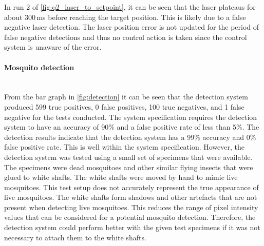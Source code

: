 In run 2 of \autoref{fig:q2_laser_to_setpoint}, it can be seen that the laser plateaus for about 300\,ms before reaching the target position. This is likely due to a false negative laser detection. The laser position error is not updated for the period of false negative detections and thus no control action is taken since the control system is unaware of the error.


\paragraph{Mosquito detection}\hfill\\
From the bar graph in \autoref{fig:detection} it can be seen that the detection system produced 599 true positives, 0 false positives, 100 true negatives, and 1 false negative for the tests conducted. The system specification requires the detection system to have an accuracy of 90\% and a false positive rate of less than 5\%. The detection results indicate that the detection system has a 99\% accuracy and 0\% false positive rate. This is well within the system specification. However, the detection system was tested using a small set of specimens that were available. The specimens were dead mosquitoes and other similar flying insects that were glued to white shafts. The white shafts were moved by hand to mimic live mosquitoes. This test setup does not accurately represent the true appearance of live mosquitoes. The white shafts form shadows and other artefacts that are not present when detecting live mosquitoes. This reduces the range of pixel intensity values that can be considered for a potential mosquito detection. Therefore, the detection system could perform better with the given test specimens if it was not necessary to attach them to the white shafts.

